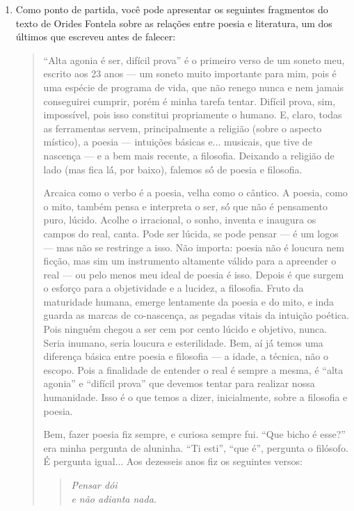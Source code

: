 \documentclass[12pt]{extarticle}
\begin{document}
\begin{enumerate}
\item Como ponto de partida, você pode apresentar os
seguintes fragmentos do texto de Orides Fontela sobre as relações entre
poesia e literatura, um dos últimos que escreveu antes de falecer:

\begin{quote}
``Alta agonia é ser, difícil prova'' é o primeiro verso de um soneto
meu, escrito aos 23 anos --- um soneto muito importante para mim, pois é
uma espécie de programa de vida, que não renego nunca e nem jamais
conseguirei cumprir, porém é minha tarefa tentar. Difícil prova, sim,
impossível, pois isso constitui propriamente o humano. E, claro, todas
as ferramentas servem, principalmente a religião (sobre o aspecto
místico), a poesia --- intuições básicas e... musicais, que tive de
nascença --- e a bem mais recente, a filosofia. Deixando a religião de
lado (mas fica lá́, por baixo), falemos só́ de poesia e filosofia.

Arcaica como o verbo é a poesia, velha como o cântico. A poesia, como o
mito, também pensa e interpreta o ser, só́ que não é pensamento puro,
lúcido. Acolhe o irracional, o sonho, inventa e inaugura os campos do
real, canta. Pode ser lúcida, se pode pensar --- é um logos --- mas não
se restringe a isso. Não importa: poesia não é loucura nem ficção, mas
sim um instrumento altamente válido para a apreender o real --- ou pelo
menos meu ideal de poesia é isso. Depois é que surgem o esforço para a
objetividade e a lucidez, a filosofia. Fruto da maturidade humana,
emerge lentamente da poesia e do mito, e inda guarda as marcas de
co-nascença, as pegadas vitais da intuição poética. Pois ninguém chegou
a ser cem por cento lúcido e objetivo, nunca. Seria inumano, seria
loucura e esterilidade. Bem, aí já́ temos uma diferença básica entre
poesia e filosofia --- a idade, a técnica, não o escopo. Pois a
finalidade de entender o real é sempre a mesma, é ``alta agonia'' e
``difícil prova'' que devemos tentar para realizar nossa humanidade.
Isso é o que temos a dizer, inicialmente, sobre a filosofia e poesia.

Bem, fazer poesia fiz sempre, e curiosa sempre fui. ``Que bicho é
esse?'' era minha pergunta de aluninha. ``Ti esti'', ``que é'', pergunta
o filósofo. É pergunta igual... Aos dezesseis anos fiz os seguintes
versos:

\begin{verse}
\emph{Pensar dói}\\
\emph{e não adianta nada.}
\end{verse}


\end{quote}
\end{enumerate}
\end{document}
